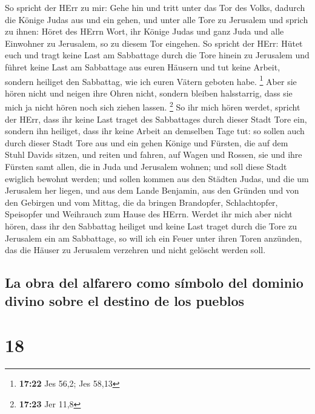  So spricht der HErr zu mir: Gehe hin und tritt unter das
Tor des Volks, dadurch die Könige Judas aus und ein gehen, und unter
alle Tore zu Jerusalem  und sprich zu ihnen: Höret des
HErrn Wort, ihr Könige Judas und ganz Juda und alle Einwohner zu
Jerusalem, so zu diesem Tor eingehen.  So spricht der
HErr: Hütet euch und tragt keine Last am Sabbattage durch die Tore
hinein zu Jerusalem  und führet keine Last am Sabbattage
aus euren Häusern und tut keine Arbeit, sondern heiliget den Sabbattag,
wie ich euren Vätern geboten habe. \footnote{\textbf{17:22} Jes 56,2;
  Jes 58,13}  Aber sie hören nicht und neigen ihre Ohren
nicht, sondern bleiben halsstarrig, dass sie mich ja nicht hören noch
sich ziehen lassen. \footnote{\textbf{17:23} Jer 11,8} 
So ihr mich hören werdet, spricht der HErr, dass ihr keine Last traget
des Sabbattages durch dieser Stadt Tore ein, sondern ihn heiliget, dass
ihr keine Arbeit an demselben Tage tut:  so sollen auch
durch dieser Stadt Tore aus und ein gehen Könige und Fürsten, die auf
dem Stuhl Davids sitzen, und reiten und fahren, auf Wagen und Rossen,
sie und ihre Fürsten samt allen, die in Juda und Jerusalem wohnen; und
soll diese Stadt ewiglich bewohnt werden;  und sollen
kommen aus den Städten Judas, und die um Jerusalem her liegen, und aus
dem Lande Benjamin, aus den Gründen und von den Gebirgen und vom Mittag,
die da bringen Brandopfer, Schlachtopfer, Speisopfer und Weihrauch zum
Hause des HErrn.  Werdet ihr mich aber nicht hören, dass
ihr den Sabbattag heiliget und keine Last traget durch die Tore zu
Jerusalem ein am Sabbattage, so will ich ein Feuer unter ihren Toren
anzünden, das die Häuser zu Jerusalem verzehren und nicht gelöscht
werden soll.

\hypertarget{la-obra-del-alfarero-como-suxedmbolo-del-dominio-divino-sobre-el-destino-de-los-pueblos}{%
\subsection{La obra del alfarero como símbolo del dominio divino sobre
el destino de los
pueblos}\label{la-obra-del-alfarero-como-suxedmbolo-del-dominio-divino-sobre-el-destino-de-los-pueblos}}

\hypertarget{section-17}{%
\section{18}\label{section-17}}

